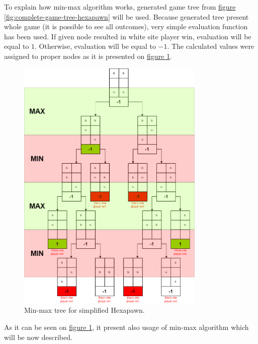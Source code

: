    To explain how min-max algorithm works, generated game tree from \hyperref[fig:complete-game-tree-hexapawn]{figure \ref*{fig:complete-game-tree-hexapawn}} will be used. Because generated tree present whole game (it is possible to see all outcomes), very simple evaluation function has been used. If given node resulted in white site player win, evaluation will be equal to $1$. Otherwise, evaluation will be equal to $-1$. The calculated values were assigned to proper nodes as it is presented on \hyperref[fig:min-max-tree-hexapawn]{figure \ref*{fig:min-max-tree-hexapawn}}.
    \begin{figure}
        \centering
        \includegraphics[width=0.8\textwidth]{dependencies/pictures/MinMax_Example.png}
        \caption{Min-max tree for simplified Hexapawn.}
        \label{fig:min-max-tree-hexapawn}
    \end{figure}

    As it can be seen on \hyperref[fig:min-max-tree-hexapawn]{figure \ref*{fig:min-max-tree-hexapawn}}, it present also usage of min-max algorithm which will be now described.

